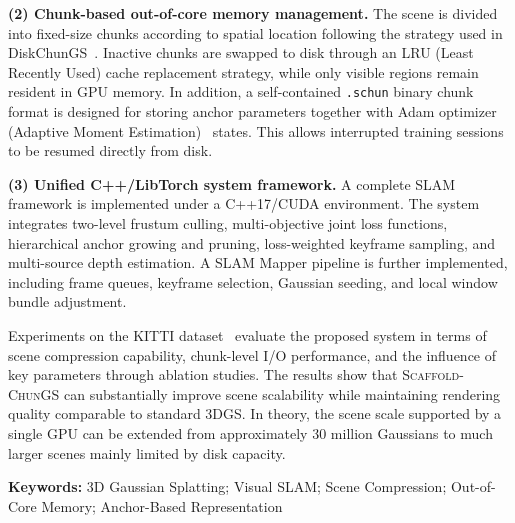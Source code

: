 \documentclass[zihao=-4,twoside,openright,fontset=none]{ctexbook}
\numberwithin{figure}{chapter}
\numberwithin{table}{chapter}
\numberwithin{equation}{chapter}
\newcommand{\ScaffoldChunGS}{\textsc{Scaffold-ChunGS}\xspace}
\newcommand{\schun}{\texttt{.schun}\xspace}
\begin{document}
\textbf{(2) Chunk-based out-of-core memory management.}
The scene is divided into fixed-size chunks according to spatial location following the strategy used in DiskChunGS~\cite{feldmann2026diskchungs}. Inactive chunks are swapped to disk through an LRU (Least Recently Used) cache replacement strategy, while only visible regions remain resident in GPU memory. In addition, a self-contained \schun binary chunk format is designed for storing anchor parameters together with Adam optimizer (Adaptive Moment Estimation)~\cite{kingma2014adam} states. This allows interrupted training sessions to be resumed directly from disk.

\textbf{(3) Unified C++/LibTorch system framework.}
A complete SLAM framework is implemented under a C++17/CUDA environment. The system integrates two-level frustum culling, multi-objective joint loss functions, hierarchical anchor growing and pruning, loss-weighted keyframe sampling, and multi-source depth estimation. A SLAM Mapper pipeline is further implemented, including frame queues, keyframe selection, Gaussian seeding, and local window bundle adjustment.

Experiments on the KITTI dataset~\cite{Geiger2012CVPR} evaluate the proposed system in terms of scene compression capability, chunk-level I/O performance, and the influence of key parameters through ablation studies. The results show that \ScaffoldChunGS can substantially improve scene scalability while maintaining rendering quality comparable to standard 3DGS. In theory, the scene scale supported by a single GPU can be extended from approximately 30 million Gaussians to much larger scenes mainly limited by disk capacity.

\vspace{1em}
\noindent\textbf{Keywords:} 3D Gaussian Splatting; Visual SLAM; Scene Compression; Out-of-Core Memory; Anchor-Based Representation

\tableofcontents

\clearpage
\renewcommand{\listfigurename}{\heiti\zihao{3}\bfseries 图清单}
\listoffigures

\renewcommand{\listtablename}{\heiti\zihao{3}\bfseries 表清单}
\listoftables

\clearpage
{}
\setcounter{page}{1}
\end{document}
